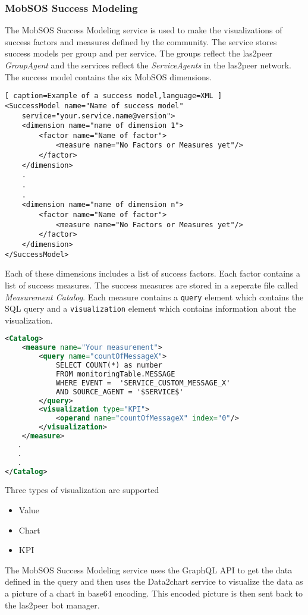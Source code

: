 \subsubsection{MobSOS Success Modeling}
The MobSOS Success Modeling service is used to make the visualizations of success factors and measures defined by the community. The service stores success models per group and per service. 
The groups reflect the las2peer \emph{GroupAgent} and the services reflect the \emph{ServiceAgents} in the las2peer network.
The success model contains the six MobSOS dimensions.
\begin{lstlisting}[ caption=Example of a success model,language=XML ]
<SuccessModel name="Name of success model" 
    service="your.service.name@version">
    <dimension name="name of dimension 1">
        <factor name="Name of factor">
            <measure name="No Factors or Measures yet"/>
        </factor>
    </dimension>
    .
    .
    .
    <dimension name="name of dimension n">
        <factor name="Name of factor">
            <measure name="No Factors or Measures yet"/>
        </factor>
    </dimension>
</SuccessModel>
\end{lstlisting}
Each of these dimensions includes a list of success factors.
Each factor contains a list of success measures. The success measures are stored in a seperate file called \emph{Measurement Catalog}. Each measure contains a \texttt{query} element which contains the SQL query and a \texttt{visualization} element which contains information about the visualization.
\begin{lstlisting}[language=XML, caption= example of a Measure Catalog]
<Catalog>
    <measure name="Your measurement">
        <query name="countOfMessageX">
            SELECT COUNT(*) as number 
            FROM monitoringTable.MESSAGE
            WHERE EVENT =  'SERVICE_CUSTOM_MESSAGE_X' 
            AND SOURCE_AGENT = '$SERVICE$'
        </query>
        <visualization type="KPI">
            <operand name="countOfMessageX" index="0"/>
        </visualization>
    </measure>
   .
   .
   .
</Catalog>
\end{lstlisting}
Three types of visualization are supported
\begin{itemize}
    \item Value
    \item Chart
    \item KPI
\end{itemize}
The MobSOS Success Modeling service uses the GraphQL API to get the data defined in the query and then uses the Data2chart service to visualize the data as a picture of a chart in base64 encoding. This encoded picture is then sent back to the las2peer bot manager.

